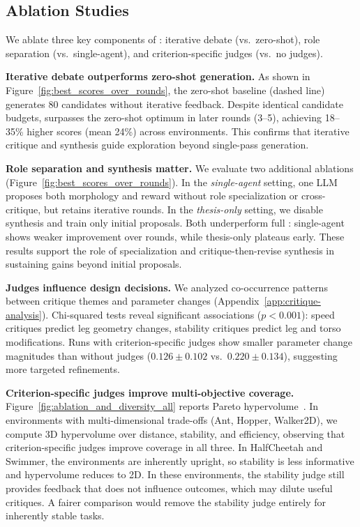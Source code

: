 \subsection{Ablation Studies}
\label{sec:ablation_studies}
We ablate three key components of \abbrev{}: iterative debate (vs.\ zero-shot), role separation (vs.\ single-agent), and criterion-specific judges (vs.\ no judges).

\textbf{Iterative debate outperforms zero-shot generation.} As shown in Figure~\ref{fig:best_scores_over_rounds}, the zero-shot baseline (dashed line) generates 80 candidates without iterative feedback. Despite identical candidate budgets, \abbrev{} surpasses the zero-shot optimum in later rounds (3--5), achieving 18--35\% higher scores (mean 24\%) across environments. This confirms that iterative critique and synthesis guide exploration beyond single-pass generation.

\textbf{Role separation and synthesis matter.} We evaluate two additional ablations (Figure~\ref{fig:best_scores_over_rounds}). In the \emph{single-agent} setting, one LLM proposes both morphology and reward without role specialization or cross-critique, but retains iterative rounds. In the \emph{thesis-only} setting, we disable synthesis and train only initial proposals. Both underperform full \abbrev{}: single-agent shows weaker improvement over rounds, while thesis-only plateaus early. These results support the role of specialization and critique-then-revise synthesis in sustaining gains beyond initial proposals.

\textbf{Judges influence design decisions.} We analyzed co-occurrence patterns between critique themes and parameter changes (Appendix~\ref{app:critique-analysis}). Chi-squared tests reveal significant associations ($p < 0.001$): speed critiques predict leg geometry changes, stability critiques predict leg and torso modifications. Runs with criterion-specific judges show smaller parameter change magnitudes than without judges ($0.126 \pm 0.102$ vs.\ $0.220 \pm 0.134$), suggesting more targeted refinements.

\textbf{Criterion-specific judges improve multi-objective coverage.}
Figure~\ref{fig:ablation_and_diversity_all} reports Pareto hypervolume~\cite{zitzler1998multiobjective, zitzler2003performance}. In environments with multi-dimensional trade-offs (Ant, Hopper, Walker2D), we compute 3D hypervolume over distance, stability, and efficiency, observing that criterion-specific judges improve coverage in all three. In HalfCheetah and Swimmer, the environments are inherently upright, so stability is less informative and hypervolume reduces to 2D. In these environments, the stability judge still provides feedback that does not influence outcomes, which may dilute useful critiques. A fairer comparison would remove the stability judge entirely for inherently stable tasks.

